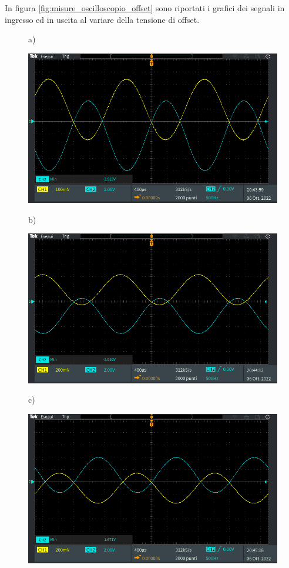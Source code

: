 In figura \ref{fig:misure_oscilloscopio_offset} sono riportati i grafici dei segnali in ingresso ed in uscita al variare della tensione di offset.
\begin{figure}[h!]
	\centering
	a)
	
	\includegraphics[width=0.8\linewidth]{./ImageFiles/Laboratorio 1/TEK00012}	
\end{figure}
\begin{figure}[h!]
	\centering
	b)
	
	\includegraphics[width=0.8\linewidth]{./ImageFiles/Laboratorio 1/TEK00013}
\end{figure}
\begin{figure}[h!]
	\centering
	c)
	
	\includegraphics[width=0.8\linewidth]{./ImageFiles/Laboratorio 1/TEK00014}
\end{figure}

